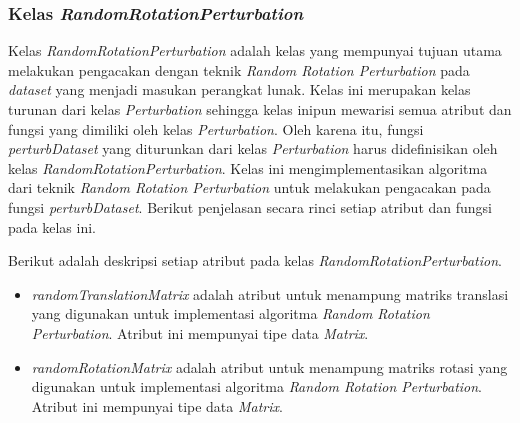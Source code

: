 \subsubsection{Kelas \textit{RandomRotationPerturbation}}
\label{subsubsec:kelas-rrp}

Kelas \textit{RandomRotationPerturbation} adalah kelas yang mempunyai tujuan utama melakukan pengacakan dengan teknik \textit{Random Rotation Perturbation} pada \textit{dataset} yang menjadi masukan perangkat lunak. Kelas ini merupakan kelas turunan dari kelas \textit{Perturbation} sehingga kelas inipun mewarisi semua atribut dan fungsi yang dimiliki oleh kelas \textit{Perturbation}. Oleh karena itu, fungsi \textit{perturbDataset} yang diturunkan dari kelas \textit{Perturbation} harus didefinisikan oleh kelas \textit{RandomRotationPerturbation}. Kelas ini mengimplementasikan algoritma dari teknik \textit{Random Rotation Perturbation} untuk melakukan pengacakan pada fungsi \textit{perturbDataset}. Berikut penjelasan secara rinci setiap atribut dan fungsi pada kelas ini.

Berikut adalah deskripsi setiap atribut pada kelas \textit{RandomRotationPerturbation}.
\begin{itemize}
	\item \textit{randomTranslationMatrix} adalah atribut untuk menampung matriks translasi yang digunakan untuk implementasi algoritma \textit{Random Rotation Perturbation}. Atribut ini mempunyai tipe data \textit{Matrix}.
	\item \textit{randomRotationMatrix} adalah atribut untuk menampung matriks rotasi yang digunakan untuk implementasi algoritma \textit{Random Rotation Perturbation}. Atribut ini mempunyai tipe data \textit{Matrix}.
\end{itemize}

